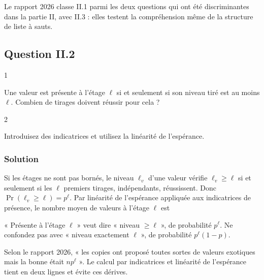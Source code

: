 \documentclass[11pt,a4paper]{article}
\renewcommand{\geq}{\geqslant}
\newcommand{\equationajustee}[1]{%
  \sbox{\boiteequation}{$\displaystyle #1$}%
  \ifdim\wd\boiteequation>\linewidth
    \[\resizebox{\linewidth}{!}{\usebox{\boiteequation}}\]%
  \else
    \[#1\]%
  \fi}
\begin{document}
\begin{jury}

Le rapport 2026 classe II.1 parmi les deux questions qui ont été discriminantes dans la partie II, avec II.3 : elles testent la compréhension même de la structure de liste à sauts.

\end{jury}

\hypertarget{question-ii.2}{%
\subsection{Question II.2}\label{question-ii.2}}

\begin{indication}{1}

Une valeur est présente à l'étage \(\ell\) si et seulement si son niveau tiré est au moins \(\ell\). Combien de tirages doivent réussir pour cela ?

\end{indication}

\begin{indication}{2}

Introduisez des indicatrices et utilisez la linéarité de l'espérance.

\end{indication}

\hypertarget{solution-11}{%
\subsubsection{Solution}\label{solution-11}}

Si les étages ne sont pas bornés, le niveau \(\ell_v\) d'une valeur vérifie \(\ell_v\geq\ell\) si et seulement si les \(\ell\) premiers tirages, indépendants, réussissent. Donc \(\Pr(\ell_v\geq\ell)=p^\ell\). Par linéarité de l'espérance appliquée aux indicatrices de présence, le nombre moyen de valeurs à l'étage \(\ell\) est

\equationajustee{\boxed{n\,p^\ell.}}

\begin{piege}

« Présente à l'étage \(\ell\) » veut dire « niveau \(\geq\ell\) », de probabilité \(p^\ell\). Ne confondez pas avec « niveau exactement \(\ell\) », de probabilité \(p^\ell(1-p)\).

\end{piege}

\begin{jury}

Selon le rapport 2026, « les copies ont proposé toutes sortes de valeurs exotiques mais la bonne était \(np^\ell\) ». Le calcul par indicatrices et linéarité de l'espérance tient en deux lignes et évite ces dérives.

\end{jury}
\end{document}
